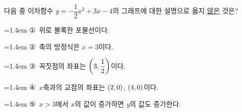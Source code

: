 다음 중 이차함수 $y=-\dfrac{1}{2}x^2+3x-4$의 그래프에 대한 설명으로 옳지 \underline{않은} 것은?
\par\medskip\par\noindent\hangindent=1.4em {\small ①}\ 위로 볼록한 포물선이다.\par\noindent\hangindent=1.4em {\small ②}\ 축의 방정식은 $x=3$이다.\par\noindent\hangindent=1.4em {\small ③}\ 꼭짓점의 좌표는 $\left(3{,}\mkern3mu \dfrac{1}{2}\right)$이다.\par\noindent\hangindent=1.4em {\small ④}\ $x$축과의 교점의 좌표는 $(2{,}\mkern3mu 0)$, $(4{,}\mkern3mu 0)$이다.\par\noindent\hangindent=1.4em {\small ⑤}\ $x>3$에서 $x$의 값이 증가하면 $y$의 값도 증가한다.\par\medskip
